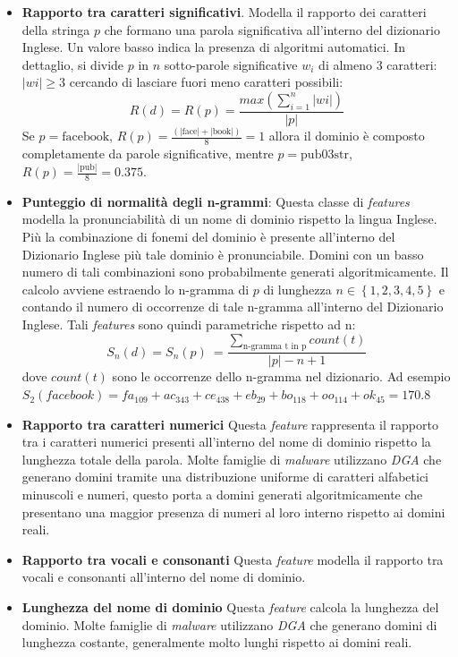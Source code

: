 \begin{itemize}

\item \textbf{Rapporto tra caratteri significativi}. Modella il rapporto dei caratteri della stringa $p$ che formano una parola significativa all'interno del dizionario Inglese. Un valore basso indica la presenza di algoritmi automatici. In dettaglio, si divide $p$ in $n$ sotto-parole significative $w_i$ di almeno $3$ caratteri: $|wi| \ge 3$ cercando di lasciare fuori meno caratteri possibili: $$R(d) = R(p) = \frac{max(\sum_{i=1}^n |wi|)}{\left | p \right |}$$ 
Se $p = \text{facebook}$, $R(p) = \frac{(|\text{face}| + |\text{book}|)}{8} = 1$ allora il dominio è composto completamente da parole significative, mentre $p = \text{pub03str}$, $R(p) = \frac{|\text{pub}|}{8} = 0.375$. 

    

\item \textbf{Punteggio di normalità degli n-grammi}: Questa classe di \textit{features} modella la pronunciabilità di un nome di dominio rispetto la lingua Inglese. Più la combinazione di fonemi del dominio è presente  all'interno del Dizionario Inglese più tale dominio è pronunciabile. Domini con un basso numero di tali combinazioni sono probabilmente generati algoritmicamente. Il calcolo avviene estraendo lo n-gramma di $p$ di lunghezza $n \in \left \{1, 2, 3, 4, 5 \right \}$ e contando il numero di occorrenze di tale n-gramma all'interno del Dizionario Inglese. Tali \textit{features} sono quindi parametriche rispetto ad n: 
$$S_n(d) = S_n(p) \:= \frac{\sum_{\text{n-gramma t in p}} count(t)}{\left | p \right | - n + 1}$$ 
dove $count(t)$ sono le occorrenze dello n-gramma nel dizionario. Ad esempio $S_2(facebook) = fa_{109} + ac_{343} + ce_{438} + eb_{29} + bo_{118} + oo_{114} + ok_{45} = 170.8$

       
\item \textbf{Rapporto tra caratteri numerici} Questa \textit{feature} rappresenta il rapporto tra i caratteri numerici presenti all'interno del nome di dominio rispetto la lunghezza totale della parola. Molte famiglie di \textit{malware} utilizzano \textit{DGA} che generano domini tramite una distribuzione uniforme di caratteri alfabetici minuscoli e numeri, questo porta a domini generati algoritmicamente che presentano una maggior presenza di numeri al loro interno rispetto ai domini reali.


\item \textbf{Rapporto tra vocali e consonanti} Questa \textit{feature} modella il rapporto tra vocali e consonanti all'interno del nome di dominio.


\item \textbf{Lunghezza del nome di dominio} Questa \textit{feature} calcola la lunghezza del dominio. Molte famiglie di \textit{malware} utilizzano \textit{DGA} che generano domini di lunghezza costante, generalmente molto lunghi rispetto ai domini reali.
	
\end{itemize}

